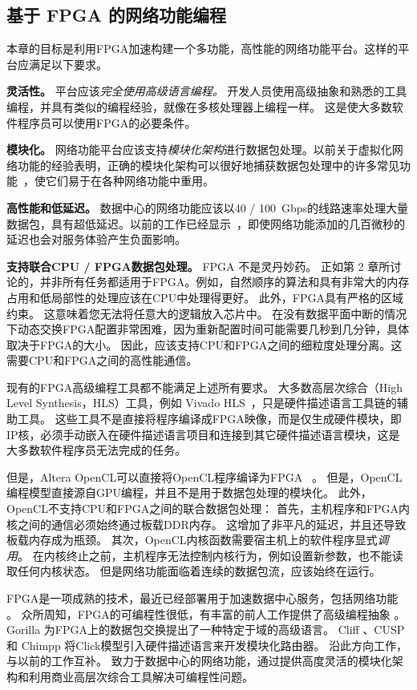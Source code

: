 \subsection{基于 FPGA 的网络功能编程}

本章的目标是利用FPGA加速构建一个多功能，高性能的网络功能平台。这样的平台应满足以下要求。

\textbf {灵活性。} 平台应该\textit {完全使用高级语言编程。}
开发人员使用高级抽象和熟悉的工具编程，并具有类似的编程经验，就像在多核处理器上编程一样。
这是使大多数软件程序员可以使用FPGA的必要条件。

\textbf {模块化。} 网络功能平台应该支持\textit {模块化架构}进行数据包处理。以前关于虚拟化网络功能的经验表明，正确的模块化架构可以很好地捕获数据包处理中的许多常见功能~\cite {kohler2000click,martins2014clickos}，使它们易于在各种网络功能中重用。

\textbf {高性能和低延迟。} 数据中心的网络功能应该以40 / 100~Gbps的线路速率处理大量数据包，具有超低延迟。以前的工作已经显示~\cite {rollback-mb}，即使网络功能添加的几百微秒的延迟也会对服务体验产生负面影响。

\textbf {支持联合CPU / FPGA数据包处理。} FPGA 不是灵丹妙药。
正如第 2 章所讨论的，并非所有任务都适用于FPGA。例如，自然顺序的算法和具有非常大的内存占用和低局部性的处理应该在CPU中处理得更好。
此外，FPGA具有严格的区域约束。
这意味着您无法将任意大的逻辑放入芯片中。
在没有数据平面中断的情况下动态交换FPGA配置非常困难，因为重新配置时间可能需要几秒到几分钟，具体取决于FPGA的大小。
因此，应该支持CPU和FPGA之间的细粒度处理分离。这需要CPU和FPGA之间的高性能通信。


现有的FPGA高级编程工具都不能满足上述所有要求。
大多数高层次综合（High Level Synthesis，HLS）工具，例如 Vivado HLS~\cite{vivado}，只是硬件描述语言工具链的辅助工具。
这些工具不是直接将程序编译成FPGA映像，而是仅生成硬件模块，即IP核，必须手动嵌入在硬件描述语言项目和连接到其它硬件描述语言模块，这是大多数软件程序员无法完成的任务。

但是，Altera OpenCL可以直接将OpenCL程序编译为FPGA~ \cite {aoc}。
但是，OpenCL编程模型直接源自GPU编程，并且不是用于数据包处理的模块化。
此外，OpenCL不支持CPU和FPGA之间的联合数据包处理：
首先，主机程序和FPGA内核之间的通信必须始终通过板载DDR内存。 这增加了非平凡的延迟，并且还导致板载内存成为瓶颈。
其次，OpenCL内核函数需要宿主机上的软件程序显式\textit {调用}。
在内核终止之前，主机程序无法控制内核行为，例如设置新参数，也不能读取任何内核状态。
但是网络功能面临着连续的数据包流，应该始终在运行。

FPGA是一项成熟的技术，最近已经部署用于加速数据中心服务，包括网络功能 \cite {putnam2014reconfigurable,smartnic,rubow2010chimpp,lavasani2012compiling}。
众所周知，FPGA的可编程性很低，有丰富的前人工作提供了高级编程抽象 \cite {bluespec,auerbach2010lime,bacon2013fpga,singh2011implementing,bachrach2012chisel,wester2015transformation}。
Gorilla \cite {lavasani2012compiling} 为FPGA上的数据包交换提出了一种特定于域的高级语言。
Cliff \cite{kulkarni2004mapping}、CUSP \cite{schelle2005cusp} 和 Chimpp \cite {rubow2010chimpp} 将Click模型引入硬件描述语言来开发模块化路由器。
\name 沿此方向工作，与以前的工作互补。
\name 致力于数据中心的网络功能，通过提供高度灵活的模块化架构和利用商业高层次综合工具解决可编程性问题。

